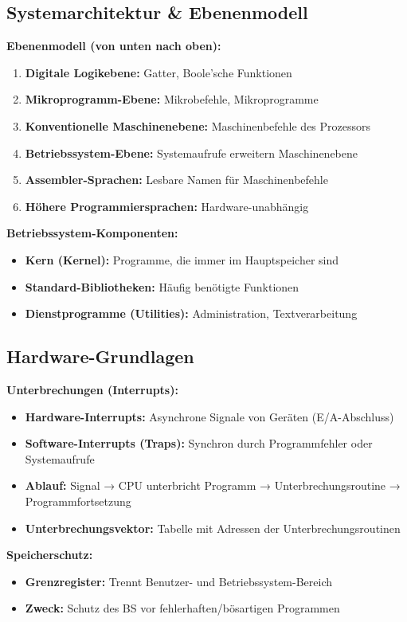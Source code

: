 \documentclass[9pt,a4paper]{extarticle}
\begin{document}
\begin{multicols*}{2}
\subsection{Systemarchitektur \& Ebenenmodell}
\textbf{Ebenenmodell (von unten nach oben):}
\begin{enumerate}
\item \textbf{Digitale Logikebene:} Gatter, Boole'sche Funktionen
\item \textbf{Mikroprogramm-Ebene:} Mikrobefehle, Mikroprogramme
\item \textbf{Konventionelle Maschinenebene:} Maschinenbefehle des Prozessors
\item \textbf{Betriebssystem-Ebene:} Systemaufrufe erweitern Maschinenebene
\item \textbf{Assembler-Sprachen:} Lesbare Namen für Maschinenbefehle
\item \textbf{Höhere Programmiersprachen:} Hardware-unabhängig
\end{enumerate}

\textbf{Betriebssystem-Komponenten:}
\begin{itemize}
\item \textbf{Kern (Kernel):} Programme, die immer im Hauptspeicher sind
\item \textbf{Standard-Bibliotheken:} Häufig benötigte Funktionen
\item \textbf{Dienstprogramme (Utilities):} Administration, Textverarbeitung
\end{itemize}

\subsection{Hardware-Grundlagen}
\textbf{Unterbrechungen (Interrupts):}
\begin{itemize}
\item \textbf{Hardware-Interrupts:} Asynchrone Signale von Geräten (E/A-Abschluss)
\item \textbf{Software-Interrupts (Traps):} Synchron durch Programmfehler oder Systemaufrufe
\item \textbf{Ablauf:} Signal → CPU unterbricht Programm → Unterbrechungsroutine → Programmfortsetzung
\item \textbf{Unterbrechungsvektor:} Tabelle mit Adressen der Unterbrechungsroutinen
\end{itemize}

\textbf{Speicherschutz:}
\begin{itemize}
\item \textbf{Grenzregister:} Trennt Benutzer- und Betriebssystem-Bereich
\item \textbf{Zweck:} Schutz des BS vor fehlerhaften/bösartigen Programmen
\end{itemize}


\end{multicols*}
\end{document}
